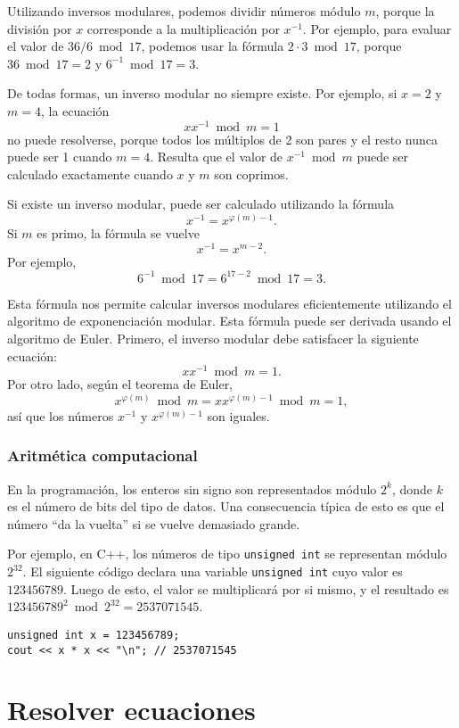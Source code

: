 Utilizando inversos modulares, podemos dividir números módulo $m$, porque
la división por $x$ corresponde a la multiplicación por $x^{-1}$. Por ejemplo,
para evaluar el valor de $36/6 \bmod 17$, podemos usar la fórmula
$2 \cdot 3 \bmod 17$, porque $36 \bmod 17 = 2$ y $6^{-1} \bmod 17 = 3$.

De todas formas, un inverso modular no siempre existe. Por ejemplo, si $x=2$
y $m=4$, la ecuación
\[ x x^{-1} \bmod m = 1 \]
no puede resolverse, porque todos los múltiplos de 2 son pares y el resto
nunca puede ser 1 cuando $m=4$. Resulta que el valor de $x^{-1} \bmod m$
puede ser calculado exactamente cuando $x$ y $m$ son coprimos.

Si existe un inverso modular, puede ser calculado utilizando la fórmula
\[
    x^{-1} = x^{\varphi(m)-1}.
\]
Si $m$ es primo, la fórmula se vuelve
\[
    x^{-1} = x^{m-2}.
\]
Por ejemplo,
\[6^{-1} \bmod 17 =6^{17-2} \bmod 17 = 3.\]

Esta fórmula nos permite calcular inversos modulares eficientemente utilizando
el algoritmo de exponenciación modular. Esta fórmula puede ser derivada usando
el algoritmo de Euler. Primero, el inverso modular debe satisfacer la
siguiente ecuación:
\[
    x x^{-1} \bmod m = 1.
\]
Por otro lado, según el teorema de Euler,
\[
    x^{\varphi(m)} \bmod m =  xx^{\varphi(m)-1} \bmod m = 1,
\]
así que los números $x^{-1}$ y $x^{\varphi(m)-1}$ son iguales.

\subsubsection{Aritmética computacional}

En la programación, los enteros sin signo son representados módulo $2^k$,
donde $k$ es el número de bits del tipo de datos. Una consecuencia típica
de esto es que el número ``da la vuelta'' si se vuelve demasiado grande.

Por ejemplo, en C++, los números de tipo \texttt{unsigned int} se representan
módulo $2^{32}$. El siguiente código declara una variable \texttt{unsigned int}
cuyo valor es $123456789$. Luego de esto, el valor se multiplicará por si mismo,
y el resultado es $123456789^2 \bmod 2^{32} = 2537071545$.

\begin{lstlisting}
unsigned int x = 123456789;
cout << x * x << "\n"; // 2537071545
\end{lstlisting}

\section{Resolver ecuaciones}

